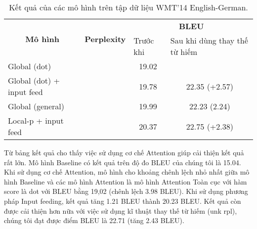 \begin{table}[]
	\centering
	\begin{tabular}{|l|l|c|c|} 
		\hline
		\multicolumn{1}{|c|}{\multirow{2}{*}{\textbf{Mô hình} }} & \multicolumn{1}{c|}{\multirow{2}{*}{\textbf{Perplexity} }} & \multicolumn{2}{c|}{\textbf{BLEU}}                                                   \\ 
		\cline{3-4}
		\multicolumn{1}{|c|}{}                                   & \multicolumn{1}{c|}{}                                      & \multicolumn{1}{l|}{Trước khi} & \multicolumn{1}{l|}{Sau khi dùng thay thế từ hiếm}  \\ 
		\hline
		Global (dot)                                             &                                                            & 19.02                          &                                                     \\ 
		\hline
		Global (dot) + input feed                                &                                                            & 19.78                          & 22.35 (+2.57)                                       \\ 
		\hline
		Global (general)                                         &                                                            & 19.99                          & 22.23 (2.24)                                        \\ 
		\hline
		Local-p + input feed                                     &                                                            & 20.37                          & 22.75 (+2.38)                                       \\
		\hline
	\end{tabular}
	\caption{Kết quả của các mô hình trên tập dữ liệu WMT'14 English-German.}
	\label{wmt14-results}
\end{table}
Từ bảng kết quả cho thấy việc sử dụng cơ chế Attention giúp cải thiện kết quả rất lớn. Mô hình Baseline có kết quả trên độ đo BLEU của chúng tôi là 15.04. Khi sử dụng cơ chế Attention, mô hình cho khoảng chênh lệch nhỏ nhất giữa mô hình Baseline và các mô hình Attention là mô hình Attention Toàn cục với hàm score là dot với BLEU bằng 19,02 (chênh lệch 3.98 BLEU). Khi sử dụng phương pháp Input feeding, kết quả tăng 1.21 BLEU thành 20.23 BLEU. Kết quả còn được cải thiện hơn nữa với việc sử dụng kĩ thuật thay thế từ hiếm (unk rpl), chúng tôi đạt được điểm BLEU là 22.71 (tăng 2.43 BLEU).

